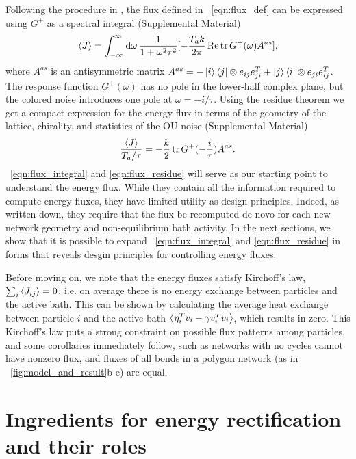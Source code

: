 \documentclass[
 preprint,
 preprintnumbers,
 amsmath,amssymb,
 aps,
 pre,
 longbibliography,
 superscriptaddress,
 10pt, twocolumn
]{revtex4-1}
\begin{document}
Following the procedure in \cite{Kundu2011LargeDeviations}, the flux defined in \eqnname~\eqref{eqn:flux_def} can be expressed using $G^+$ as a spectral integral (Supplemental Material)
\begin{equation} \label{eqn:flux_integral}
    \expval{J} = \int_{-\infty}^\infty \dd{\omega} \frac{1}{1+\omega^2\tau^2} [-\frac{T_a k}{2\pi} \Re \tr G^+(\omega)A^{as}] ,
\end{equation}
where $A^{as}$ is an antisymmetric matrix
$A^{as} = -\ket{i}\bra{j} \otimes e_{ij}e_{ji}^T + \ket{j}\bra{i} \otimes e_{ji}e_{ij}^T$.
The response function $G^+(\omega)$ has no pole in the lower-half complex plane, but the colored noise introduces one pole at $\omega = -i/\tau$. Using the residue theorem we get a compact expression for the energy flux in terms of the geometry of the lattice, chirality, and statistics of the OU noise (Supplemental Material)
\begin{equation} \label{eqn:flux_residue}
    \frac{\expval{J}}{T_a/\tau} = -\frac{k}{2} \tr G^+(-\frac{i}{\tau})A^{as} .
\end{equation}
\eqnname~\eqref{eqn:flux_integral} and \eqref{eqn:flux_residue} will serve as our starting point to understand the energy flux. While they contain all the information required to compute energy fluxes, they have limited utility as design principles. Indeed, as written down, they require that the flux be recomputed de novo for each new network geometry and non-equilibrium bath activity. In the next sections, we show that it is possible to expand \eqnname~\eqref{eqn:flux_integral} and \eqref{eqn:flux_residue} in forms that reveals desgin principles for controlling energy fluxes.

Before moving on, we note that the energy fluxes satisfy Kirchoff's law, $\sum_i \expval{J_{ij}} = 0$, i.e. on average there is no energy exchange between particles and the active bath. This can be shown by calculating the average heat exchange between particle $i$ and the active bath $\expval{\eta_i^T v_i - \gamma v_i^T v_i}$, which results in zero.
This Kirchoff's law puts a strong constraint on possible flux patterns among particles, and some corollaries immediately follow, such as networks with no cycles cannot have nonzero flux, and fluxes of all bonds in a polygon network (as in \figurename~\ref{fig:model_and_result}b-e) are equal.


\section{Ingredients for energy rectification and their roles} \label{sec:fourier}
\end{document}
